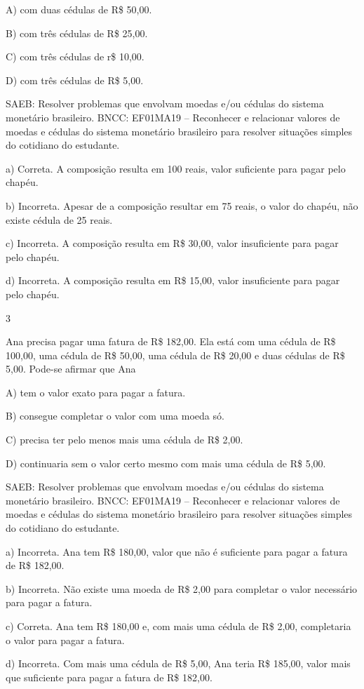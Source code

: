 A) com duas cédulas de R\$ 50,00.

B) com três cédulas de R\$ 25,00.

C) com três cédulas de r\$ 10,00.

D) com três cédulas de R\$ 5,00.

SAEB: Resolver problemas que envolvam moedas e/ou cédulas do
sistema monetário brasileiro.
BNCC: EF01MA19 -- Reconhecer e relacionar valores de moedas e cédulas do
sistema monetário brasileiro para resolver situações simples do
cotidiano do estudante.

a) Correta. A composição resulta em 100 reais, valor suficiente para pagar pelo chapéu.

b) Incorreta. Apesar de a composição resultar em 75 reais, o valor do chapéu, não existe cédula de 25 reais.

c) Incorreta. A composição resulta em R\$ 30,00, valor insuficiente para pagar pelo chapéu.

d) Incorreta. A composição resulta em R\$ 15,00, valor insuficiente para pagar pelo chapéu.

\num{3}

Ana precisa pagar uma fatura de R\$ 182,00. Ela está com uma cédula de R\$ 100,00, uma cédula de R\$ 50,00, uma cédula de R\$ 20,00 e duas cédulas de R\$ 5,00. Pode-se afirmar que Ana

A) tem o valor exato para pagar a fatura.

B) consegue completar o valor com uma moeda só.

C) precisa ter pelo menos mais uma cédula de R\$ 2,00.

D) continuaria sem o valor certo mesmo com mais uma cédula de R\$ 5,00.

SAEB: Resolver problemas que envolvam moedas e/ou cédulas do
sistema monetário brasileiro.
BNCC: EF01MA19 -- Reconhecer e relacionar valores de moedas e cédulas do
sistema monetário brasileiro para resolver situações simples do
cotidiano do estudante.

a) Incorreta. Ana tem R\$ 180,00, valor que não é suficiente para pagar a fatura de R\$ 182,00.

b) Incorreta. Não existe uma moeda de R\$ 2,00 para completar o valor necessário para pagar a fatura.

c) Correta. Ana tem R\$ 180,00 e, com mais uma cédula de R\$ 2,00, completaria o valor para pagar a fatura.

d) Incorreta. Com mais uma cédula de R\$ 5,00, Ana teria R\$ 185,00, valor mais que suficiente para pagar a fatura de R\$ 182,00.

